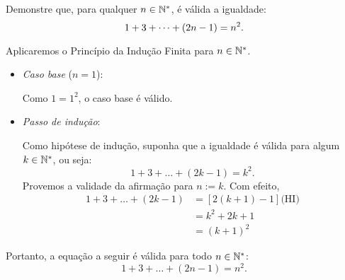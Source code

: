 \begin{example}
Demonstre que, para qualquer $n \in \mathbb{N}^*$, é válida a igualdade:
%
\begin{equation*}
1+3+\dots +\left(2n-1\right) = n^2.
\end{equation*}
\end{example}

\begin{solution}
Aplicaremos o Princípio da Indução Finita para $n \in \mathbb{N}^*$.
%
\begin{itemize}
	\item \textit{Caso base} ($n=1$):

	Como $1=1^2$, o caso base é válido.

	\item \textit{Passo de indução}:

	Como hipótese de indução, suponha que a igualdade é válida para algum $k\in \mathbb{N}^*$, ou seja:
	\begin{equation*}
	1+3+\dots+(2k-1) = k^2.
	\end{equation*}
	Provemos a validade da afirmação para $n := k$. Com efeito,
	\begin{align*}
	1+3+\dots + (2k-1) & = \left[2(k+1)-1\right] \text{(HI)} \\
	& = k^2+2k+1 \\
	& = (k+1)^2
	\end{align*}
\end{itemize}
%
Portanto, a equação a seguir é válida para todo $n \in \mathbb{N}^*$:
%
\begin{equation*}
1+3+\dots + (2n-1) = n^2.
\end{equation*}
\end{solution}